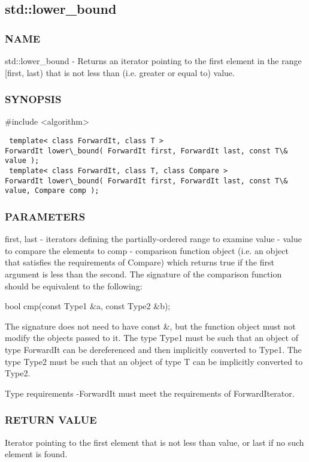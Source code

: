 \subsection{std::lower\_bound}

\subsubsection{NAME}
std::lower\_bound - Returns an iterator pointing to the first element in the range [first, last) that is not less than (i.e. greater or equal to) value.

\subsubsection{SYNOPSIS}
\#include <algorithm>

\begin{lstlisting}
 template< class ForwardIt, class T >
ForwardIt lower\_bound( ForwardIt first, ForwardIt last, const T\& value );
 template< class ForwardIt, class T, class Compare >
ForwardIt lower\_bound( ForwardIt first, ForwardIt last, const T\& value, Compare comp );
\end{lstlisting}

\subsubsection{PARAMETERS}
first, last - iterators defining the partially-ordered range to examine
value - value to compare the elements to
comp - comparison function object (i.e. an object that satisfies the requirements of Compare) which returns true if the first argument is less than the second.
The signature of the comparison function should be equivalent to the following:

 bool cmp(const Type1 \&a, const Type2 \&b);

The signature does not need to have const \&, but the function object must not modify the objects passed to it.
The type Type1 must be such that an object of type ForwardIt can be dereferenced and then implicitly converted to Type1. The type Type2 must be such that an object of type T can be implicitly converted to Type2.

 Type requirements
 -ForwardIt must meet the requirements of ForwardIterator.

\subsubsection{RETURN VALUE}
Iterator pointing to the first element that is not less than value, or last if no such element is found.



